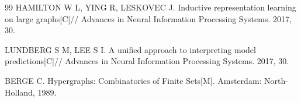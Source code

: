 \begin{thebibliography}{99}
HAMILTON W L, YING R, LESKOVEC J.
Inductive representation learning on large graphs[C]//
Advances in Neural Information Processing Systems.
2017, 30.

LUNDBERG S M, LEE S I.
A unified approach to interpreting model predictions[C]//
Advances in Neural Information Processing Systems.
2017, 30.

BERGE C.
Hypergraphs: Combinatorics of Finite Sets[M].
Amsterdam: North-Holland, 1989.

\end{thebibliography}

